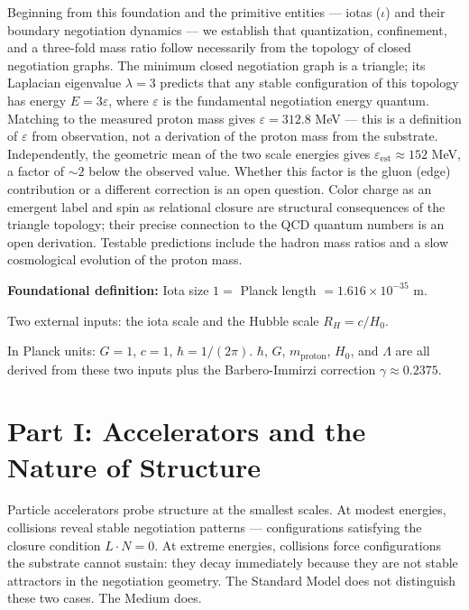 \documentclass[11pt,letterpaper]{article}
\newenvironment{plainbox}{\begin{tcolorbox}[colback=blue!3!white,colframe=blue!40!white,title={\small\textit{In plain language}},breakable]}{\end{tcolorbox}}
\newenvironment{defbox}{\begin{tcolorbox}[colback=green!3!white,colframe=green!45!black,title={\small\textit{Foundational definition}},breakable]}{\end{tcolorbox}}
\begin{document}
Beginning from this foundation and the primitive entities --- iotas (\(\iota\)) and their boundary negotiation dynamics --- we establish that quantization, confinement, and a three-fold mass ratio follow necessarily from the topology of closed negotiation graphs. The minimum closed negotiation graph is a triangle; its Laplacian eigenvalue \(\lambda = 3\) predicts that any stable configuration of this topology has energy \(E = 3\varepsilon\), where \(\varepsilon\) is the fundamental negotiation energy quantum. Matching to the measured proton mass gives \(\varepsilon = 312.8\) MeV --- this is a definition of \(\varepsilon\) from observation, not a derivation of the proton mass from the substrate. Independently, the geometric mean of the two scale energies gives \(\varepsilon_\text{est} \approx 152\) MeV, a factor of \({\sim}2\) below the observed value. Whether this factor is the gluon (edge) contribution or a different correction is an open question. Color charge as an emergent label and spin as relational closure are structural consequences of the triangle topology; their precise connection to the QCD quantum numbers is an open derivation. Testable predictions include the hadron mass ratios and a slow cosmological evolution of the proton mass.

\begin{defbox}
\textbf{Foundational definition:} Iota size $1 =$ Planck length $= 1.616 \times 10^{-35}$ m.

Two external inputs: the iota scale and the Hubble scale $R_H = c/H_0$.

In Planck units: $G = 1$, $c = 1$, $\hbar = 1/(2\pi)$. $\hbar$, $G$, $m_\text{proton}$, $H_0$, and $\Lambda$ are all derived from these two inputs plus the Barbero-Immirzi correction $\gamma \approx 0.2375$.
\end{defbox}

\section{Part I: Accelerators and the Nature of Structure}
\label{sec:org486888c}

\begin{plainbox}
Particle accelerators probe structure at the smallest scales. At modest energies, collisions reveal stable negotiation patterns --- configurations satisfying the closure condition $L \cdot N = 0$. At extreme energies, collisions force configurations the substrate cannot sustain: they decay immediately because they are not stable attractors in the negotiation geometry. The Standard Model does not distinguish these two cases. The Medium does.
\end{plainbox}
\end{document}
